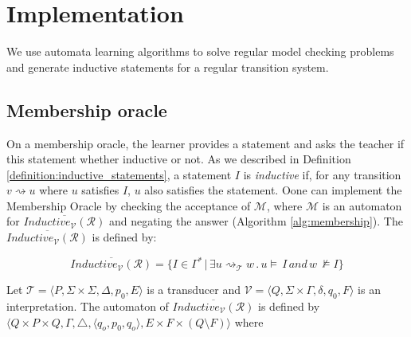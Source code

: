 \chapter{Implementation}\label{chapter:implementation}

We use automata learning algorithms to solve regular 
model checking problems and generate inductive statements for a regular transition system.

\section{Membership oracle}
On a membership oracle, the learner provides a statement and asks the teacher if 
this statement whether inductive or not. As we described in Definition \ref{definition:inductive_statements}, 
a statement $I$ is \textit{inductive} if, for any transition $v \rightsquigarrow u$
where $u$ satisfies $I$, $u$ also satisfies the statement.
Oone can implement the Membership Oracle by checking the acceptance 
of $\mathcal{M}$, where $\mathcal{M}$ is an automaton for 
$\overline{Inductive_{\mathcal{V}}(\mathcal{R})}$ and negating the answer (Algorithm \ref{alg:membership}).
The $\overline{Inductive_{\mathcal{V}}(\mathcal{R})}$ is defined by:

\begin{equation}\label{eq:non_inductive}
\overline{Inductive_{\mathcal{V}}(\mathcal{R})} = \lbrace I \in \Gamma^* \, | \, \exists u
\rightsquigarrow_\mathcal{T} w \, . \, u \models \, I \, and \, w \, \not\models I\rbrace
\end{equation}

Let $\mathcal{T} =  \langle P, \Sigma \times \Sigma, \Delta, p_0, E \rangle$ 
is a transducer and  $\mathcal{V} =  \langle Q, \Sigma \times \Gamma, \delta, q_0, F \rangle$ is 
an interpretation. The automaton of $\overline{Inductive_{\mathcal{V}}(\mathcal{R})}$ 
is defined by $\langle Q \times P \times Q, \Gamma, \triangle, \langle q_o,  p_0, q_o \rangle, 
E \times F \times (Q \setminus F) \rangle$ where

